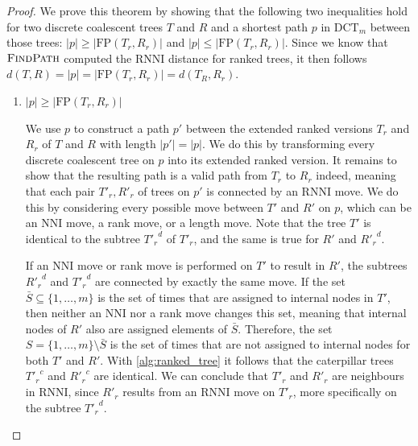 \documentclass[11pt]{amsart}
\newcommand{\rnni}{\mathrm{RNNI}}
\newcommand{\findpath}{\textsc{FindPath}}
\newcommand{\nni}{\mathrm{NNI}}
\newcommand{\fp}{\mathrm{FP}}
\newcommand{\dct}{\mathrm{DCT}}
\providecommand{\DIFaddtex}[1]{{\protect\color{blue}\uwave{#1}}} %
\providecommand{\DIFdeltex}[1]{{\protect\color{red}\sout{#1}}}                      %
\providecommand{\DIFaddbegin}{} %
\providecommand{\DIFaddend}{} %
\providecommand{\DIFdelbegin}{} %
\providecommand{\DIFdelend}{} %
\providecommand{\DIFadd}[1]{\texorpdfstring{\DIFaddtex{#1}}{#1}} %
\providecommand{\DIFdel}[1]{\texorpdfstring{\DIFdeltex{#1}}{}} %
\newcommand{\DIFscaledelfig}{0.5}
\newlength{\DIFdelgraphicswidth} %
\newlength{\DIFdelgraphicsheight} %
\newcommand{\DIFaddincludegraphics}[2][]{{\color{blue}\fbox{\DIFOincludegraphics[#1]{#2}}}} %
\newcommand{\DIFdelincludegraphics}[2][]{%
\sbox{\DIFdelgraphicsbox}{\DIFOincludegraphics[#1]{#2}}%
\settoboxwidth{\DIFdelgraphicswidth}{\DIFdelgraphicsbox} %
\settoboxtotalheight{\DIFdelgraphicsheight}{\DIFdelgraphicsbox} %
\scalebox{\DIFscaledelfig}{%
\parbox[b]{\DIFdelgraphicswidth}{\usebox{\DIFdelgraphicsbox}\\[-\baselineskip] \rule{\DIFdelgraphicswidth}{0em}}\llap{\resizebox{\DIFdelgraphicswidth}{\DIFdelgraphicsheight}{%
\setlength{\unitlength}{\DIFdelgraphicswidth}%
\begin{picture}(1,1)%
\thicklines\linethickness{2pt} %
{\color[rgb]{1,0,0}\put(0,0){\framebox(1,1){}}}%
{\color[rgb]{1,0,0}\put(0,0){\line( 1,1){1}}}%
{\color[rgb]{1,0,0}\put(0,1){\line(1,-1){1}}}%
\end{picture}%
}\hspace*{3pt}}} %
} %
\DeclareRobustCommand{\DIFaddbegin}{\DIFOaddbegin \let\includegraphics\DIFaddincludegraphics} %
\DeclareRobustCommand{\DIFaddend}{\DIFOaddend \let\includegraphics\DIFOincludegraphics} %
\DeclareRobustCommand{\DIFdelbegin}{\DIFOdelbegin \let\includegraphics\DIFdelincludegraphics} %
\DeclareRobustCommand{\DIFdelend}{\DIFOaddend \let\includegraphics\DIFOincludegraphics} %
\begin{document}
\begin{proof}
	We prove this theorem by showing that the following two inequalities hold for two discrete coalescent trees $T$ and $R$ and a shortest path $p$ in $\dct_m$ between those trees: $|p| \geq |\fp(T_r,R_r)|$ and $|p| \leq |\fp(T_r,R_r)|$.
	Since we know that $\findpath$ computed the $\rnni$ distance for ranked trees, it then follows \DIFdelbegin \DIFdel{$d(T,R) = |p| = |\fp(T_r,R_r)| = d(T_R,R_r)$}\DIFdelend \DIFaddbegin \DIFadd{$d_{\dct}(T,R) = |p| = |\fp(T_r,R_r)| = d_{\rnni}(T_R,R_r)$}\DIFaddend .

	\begin{enumerate}
		\item $|p| \geq |\fp(T_r,R_r)|$

		We use $p$ to construct a path $p'$ between the extended ranked versions $T_r$ and $R_r$ of $T$ and $R$ with length $|p'| = |p|$.
		We do this by transforming every discrete coalescent tree on $p$ into its extended ranked version.
		It remains to show that the resulting path is a valid path from $T_r$ to $R_r$ indeed, meaning that each pair $T'_r, R'_r$ of trees on $p'$ is connected by an $\rnni$ move.
		We do this by considering every possible move between $T'$ and $R'$ on $p$, which can be an $\nni$ move, a rank move, or a length move.
		Note that the tree $T'$ is identical to the subtree ${T'_r}^d$ of $T'_r$, and the same is true for $R'$ and ${R'_r}^d$.

		If an $\nni$ move or rank move is performed on $T'$ to result in $R'$, the subtrees ${R'_r}^d$ and ${T'_r}^d$ are connected by exactly the same move.
		If the set $\bar{S} \subseteq \{1, \ldots, m\}$ is the set of times that are assigned to internal nodes in $T'$, then neither an $\nni$ nor a rank move changes this set, meaning that internal nodes of $R'$ also are assigned elements of $\bar S$.
		Therefore, the set $S = \{1, \ldots, m\} \setminus \bar S$ is the set of times that are not assigned to internal nodes for both $T'$ and $R'$.
		With \autoref{alg:ranked_tree} it follows that the caterpillar trees ${T'_r}^c$ and ${R'_r}^c$ are identical.
		We can conclude that $T'_r$ and $R'_r$ are neighbours in $\rnni$, since $R'_r$ results from an $\rnni$ move on $T'_r$, more specifically on the subtree ${T'_r}^d$.


\end{enumerate}
\end{proof}
\end{document}
